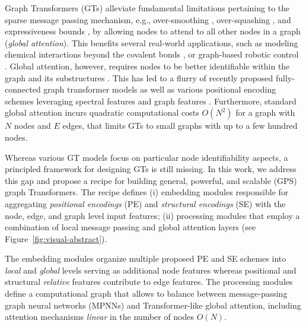 \documentclass{article}
\begin{document}
Graph Transformers (GTs) alleviate fundamental limitations pertaining to the sparse message passing mechanism, e.g., over-smoothing \cite{Oono2020Graph}, over-squashing \cite{alon2021on}, and expressiveness bounds \cite{xu2018how, morris2019}, by allowing nodes to attend to all other nodes in a graph (\emph{global attention}).
This benefits several real-world applications, such as modeling chemical interactions beyond the covalent bonds \cite{ying2021graphormer}, or graph-based robotic control \cite{kurin2020my_body}.
Global attention, however, requires  nodes to be better identifiable within the graph and its substructures \cite{dwivedi2020generalization}. 
This has led to a flurry of recently proposed fully-connected graph transformer models \cite{dwivedi2020generalization,kreuzer2021rethinking,ying2021graphormer,mialon2021graphit,jain2021graphtrans} as well as various positional encoding schemes leveraging spectral features \cite{dwivedi2020generalization,kreuzer2021rethinking,lim2022sign} and graph features \cite{dwivedi2022LPE,chen2022SAT}.
Furthermore, standard global attention incurs quadratic computational costs $O(N^2)$ for a graph with $N$ nodes and $E$ edges, that limits GTs to small graphs with up to a few hundred nodes.

Whereas various GT models focus on particular node identifiability aspects, a principled framework for designing GTs is still missing. 
In this work, we address this gap and propose a recipe for building general, powerful, and scalable (GPS) graph Transformers.
The recipe defines (i) embedding modules responsible for aggregating \emph{positional encodings} (PE) and \emph{structural encodings} (SE) with the node, edge, and graph level input features;
(ii) processing modules that employ a combination of local message passing and global attention layers (see Figure~\ref{fig:visual-abstract}).

The embedding modules organize multiple proposed PE and SE schemes into \emph{local} and \emph{global} levels serving as additional node features whereas positional and structural \emph{relative} features contribute to edge features. 
The processing modules define a computational graph that allows to balance between message-passing graph neural networks (MPNNs) and Transformer-like global attention, including attention mechanisms \emph{linear} in the number of nodes $O(N)$. 
\end{document}
